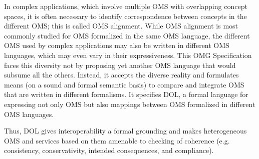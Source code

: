 \documentclass[10pt,fleqn,%
\ifpretendfinal
final%
\else
draft%
\fi,
]{scrreprt}
\makeatletter
\newcommand*{\eg}{e.g.\@\xspace}
\newcommand*\CommentAuthor{}
\renewcommand*\CommentAuthor{#1}}
\newcommand*\CommentDate{}
\renewcommand*\CommentDate{#1}}
\newcommand*\CommentId{}
\renewcommand*\CommentId{#1}}
\newcommand*\CommentType{}
\renewcommand*\CommentType{#1}}
\newcommand*{\SetCommentColorByType}[1]{%
\edef\localType{{#1}}%
\expandafter\ifstrequal\localType{q-aut}{\colorlet{CommentColor}{red}}{%
\expandafter\ifstrequal\localType{q-all}{\colorlet{CommentColor}{orange}}{%
\expandafter\ifstrequal\localType{todo}{\colorlet{CommentColor}{orange}}{%
\expandafter\ifstrequal\localType{fyi}{\colorlet{CommentColor}{lightgray}}{%
\colorlet{CommentColor}{yellow}}}}}}
\newcommand*{\SetCommentPrefixByType}[1]{%
\edef\localType{{#1}}%
\expandafter\@ifmtarg\localType{%
\edef\CommentPrefix{}%
}{%
\caseupper[q]{#1}%
\edef\CommentPrefix{\thestring: }%
}}
\newcommand*{\initComment}[1]{%
\setkeys{Comment}{#1}%
\SetCommentColorByType{\CommentType}%
\relax%
\SetCommentPrefixByType{\CommentType}%
\relax%
}
\newcommand*{\todonote}[2][]{%
\initComment{#1}%
\pdfcomment[author=\CommentAuthor,color=CommentColor,date=\CommentDate,id=\CommentId]{%
\CommentPrefix
#2}}
\renewcommand*{\todonote}[2][]{%
\initComment{#1}%
\ednote{\CommentPrefix #2}}
\newcommand*{\IS}{OMG Specification\xspace}
\makeatother
\begin{document}
In complex applications, which involve multiple OMS with overlapping concept spaces,
it is often necessary to identify correspondence between concepts in the different OMS; this is called  OMS alignment. 
While OMS alignment is most commonly studied for OMS formalized in the same OMS 
language, the different OMS used by complex applications may also be written in different 
OMS languages, which may even vary in their expressiveness. 
This \IS faces this diversity not by proposing yet another OMS language that would subsume all the others.  
Instead, it accepts the diverse reality and formulates means (on a sound and formal semantic basis) 
to compare and integrate OMS that are written in different formalisms.
It specifies DOL, a formal language for
expressing not only OMS but also mappings between OMS formalized in different OMS languages.

Thus, DOL gives interoperability a formal grounding and makes heterogeneous OMS and services based
on them amenable to checking of coherence (\eg consistency, conservativity, intended consequences,
and compliance).

\end{document}
